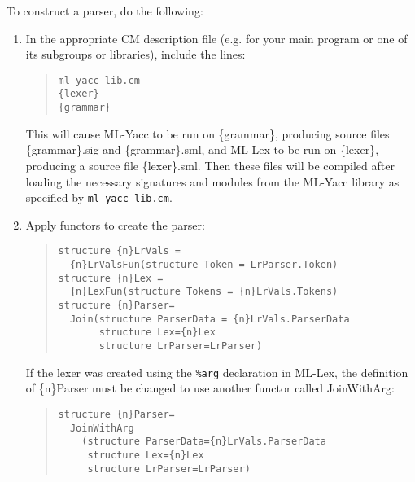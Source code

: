 To construct a parser, do the following:
\begin{enumerate}
\item In the appropriate CM description file (e.g. for your main
program or one of its subgroups or libraries), include the lines:
\begin{quote}
\begin{verbatim}
ml-yacc-lib.cm
{lexer}
{grammar}
\end{verbatim}  
\end{quote}
This will cause ML-Yacc to be run on \{grammar\}, producing source files
\{grammar\}.sig and \{grammar\}.sml, and ML-Lex to be run on
\{lexer\}, producing a source file \{lexer\}.sml.  Then these files
will be compiled after loading the necessary signatures and modules
from the ML-Yacc library as specified by {\tt ml-yacc-lib.cm}.
\item Apply functors to create the parser:
\begin{quote}
\begin{verbatim}
structure {n}LrVals =
  {n}LrValsFun(structure Token = LrParser.Token)
structure {n}Lex = 
  {n}LexFun(structure Tokens = {n}LrVals.Tokens)
structure {n}Parser=
  Join(structure ParserData = {n}LrVals.ParserData
       structure Lex={n}Lex
       structure LrParser=LrParser)
\end{verbatim}
\end{quote}
If the lexer was created using the {\tt \%arg} declaration in ML-Lex,
the definition of \{n\}Parser must be changed to use another functor
called JoinWithArg:
\begin{quote}
\begin{verbatim}
structure {n}Parser=
  JoinWithArg
    (structure ParserData={n}LrVals.ParserData
     structure Lex={n}Lex
     structure LrParser=LrParser)
\end{verbatim}
\end{quote}
\end{enumerate}

